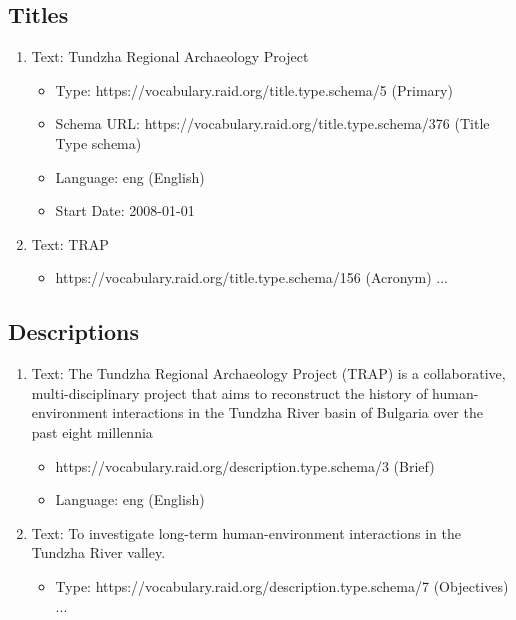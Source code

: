\documentclass[a0,portrait]{a0poster}
\begin{document}
\begin{multicols}{2}
\begin{tiny}
\subsection*{Titles}
\begin{enumerate}
\item Text: Tundzha Regional Archaeology Project
   \begin{itemize}
   \item Type: https://vocabulary.raid.org/title.type.schema/5 (Primary)
   \item Schema URL: https://vocabulary.raid.org/title.type.schema/376 (Title Type schema)
   \item Language: eng (English)
   \item Start Date: 2008-01-01
   \end{itemize}

\item Text: TRAP
   \begin{itemize}
   \item https://vocabulary.raid.org/title.type.schema/156 (Acronym) ...
   \end{itemize}
\end{enumerate}

\subsection*{Descriptions}
\begin{enumerate}
\item Text: The Tundzha Regional Archaeology Project (TRAP) is a collaborative, multi-disciplinary project that aims to reconstruct the history of human-environment interactions in the Tundzha River basin of Bulgaria over the past eight millennia
   \begin{itemize}
   \item https://vocabulary.raid.org/description.type.schema/3 (Brief)
   \item Language: eng (English)
   \end{itemize}

\item Text: To investigate long-term human-environment interactions in the Tundzha River valley.
   \begin{itemize}
   \item Type: https://vocabulary.raid.org/description.type.schema/7 (Objectives) ...
   \end{itemize}

\end{enumerate}


\end{tiny}
\end{multicols}
\end{document}
